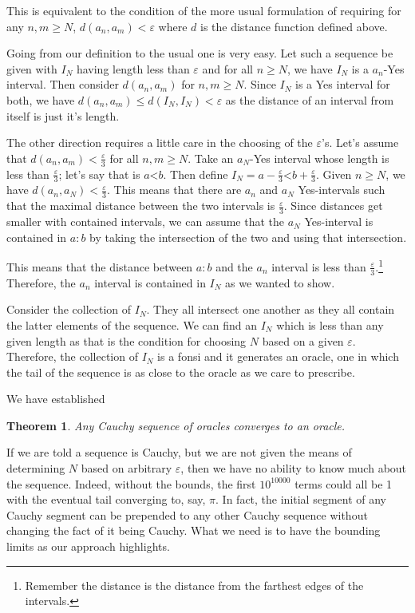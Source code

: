 \documentclass[12pt]{article}
\newtheorem{theorem}{Theorem}
\theoremstyle{remark}
\newcommand{\lt}{\mathord{<}}
\begin{document}
This is equivalent to the condition of the more usual formulation of requiring for any $n, m \geq N$, $d(a_n,  a_m) < \varepsilon$ where $d$ is the distance function defined above. 

Going from our definition to the usual one is very easy. Let such a sequence be given with $I_N$ having length less than $\varepsilon$ and for all $n \geq N$, we have $I_N$ is a $a_n$-Yes interval. Then consider $d(a_n, a_m)$ for $n, m \geq N$. Since $I_N$ is a Yes interval for both, we have $d(a_n, a_m) \leq d(I_N, I_N) < \varepsilon$ as the distance of an interval from itself is just it's length. 

The other direction requires a little care in the choosing of the $\varepsilon$'s. Let's assume that $d(a_n, a_m) < \frac{\varepsilon}{3}$ for all $n, m \geq N$. Take an $a_N$-Yes interval whose length is less than $\frac{\varepsilon}{3}$; let's say that is $a \lt b$. Then define $I_N = a-\frac{\varepsilon}{3} \lt b + \frac{\varepsilon}{3}$. Given $n \geq N$, we have $d(a_n, a_N) < \frac{\varepsilon}{3}$. This means that there are $a_n$ and $a_N$ Yes-intervals such that the maximal distance between the two intervals is $\frac{\varepsilon}{3}$. Since distances get smaller with contained intervals, we can assume that the $a_N$ Yes-interval is contained in $a:b$ by taking the intersection of the two and using that intersection. 

This means that the distance between $a:b$ and the $a_n$ interval is less than $\frac{\varepsilon}{3}$.\footnote{Remember the distance is the distance from the farthest edges of the intervals.} Therefore, the $a_n$ interval is contained in $I_N$ as we wanted to show.  

Consider the collection of $I_N$. They all intersect one another as they all contain the latter elements of the sequence. We can find an $I_N$ which is less than any given length as that is the condition for choosing $N$ based on a given $\varepsilon$. Therefore, the collection of $I_N$ is a fonsi and it generates an oracle, one in which the tail of the sequence is as close to the oracle as we care to prescribe. 

We have established

\begin{theorem}\label{th:cauchy}
Any Cauchy sequence of oracles converges to an oracle. 
\end{theorem}

If we are told a sequence is Cauchy, but we are not given the means of determining $N$ based on arbitrary $\varepsilon$, then we have no ability to know much about the sequence. Indeed, without the bounds, the first $10^10000$ terms could all be 1 with the eventual tail converging to, say, $\pi$.  In fact, the initial segment of any Cauchy segment can be prepended to any other Cauchy sequence without changing the fact of it being Cauchy. What we need is to have the bounding limits as our approach highlights. 
\end{document}
